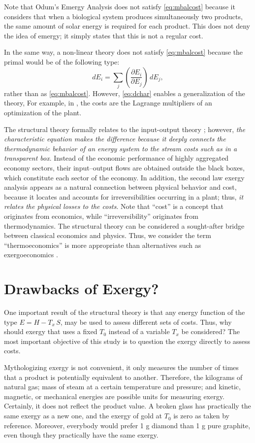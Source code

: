 \documentclass[energies,article,submit,moreauthors,pdftex]{Definitions/mdpi}
\newcommand{\dpartial}[2]{\left(\dfrac{\partial E_{#1}}{\partial E_{#2}}\right)}
\begin{document}
Note that Odum's Emergy Analysis \cite{Odum1988,Brown1996} does not satisfy \eqref{eq:mbalcost} because it considers that when a biological system produces simultaneously two products, the same amount of solar energy is required for each product. This does not deny the idea of emergy; it simply states that this is not a regular cost.

In the same way, a non-linear theory does not satisfy \cref{eq:mbalcost} because the primal would be of the following type:
\begin{equation}
dE_i=\sum_j \dpartial{i}{j}\, dE_j,
\label{eq:dchar}
\end{equation}
rather than as \cref{eq:mbalcost}. However, \cref{eq:dchar} enables a generalization of the theory, For example, in \cite{Brown1996}, the costs are the Lagrange multipliers of an optimization of the plant.

The structural theory formally relates to the input-output theory \cite{Leontief1970}; however, \emph{the characteristic equation makes the difference because it deeply connects the thermodynamic behavior of an energy system to the stream costs such as in a transparent box}. Instead of the economic performance of highly aggregated economy sectors, their input–output flows are obtained outside the black boxes, which constitute each sector of the economy. In addition, the second law exergy analysis appears as a natural connection between physical behavior and cost, because it locates and accounts for irreversibilities occurring in a plant; thus, \emph{it relates the physical losses to the costs}. Note that “cost” is a concept that originates from economics, while “irreversibility” originates from thermodynamics. The structural theory can be considered a sought-after bridge between classical economics and physics. Thus, we consider the term “thermoeconomics” is more appropriate than alternatives such as exergoeconomics \cite{Tsatsaronis2007}. 


\section{Drawbacks of Exergy?}
One important result of the structural theory is that any energy function of the type ${E=H-T_x\,S}$, may be used to assess different sets of costs. Thus, why should exergy that uses a fixed $T_0$ instead of a variable $T_x$ be considered? The most important objective of this study is to question the exergy directly to assess costs. 

Mythologizing exergy is not convenient, it only measures the number of times that a product is potentially equivalent to another. Therefore, the kilograms of natural gas; mass of steam at a certain temperature and pressure; and kinetic, magnetic, or mechanical energies are possible units for measuring exergy. Certainly, it does not reflect the product value. A broken glass has practically the same exergy as a new one, and the  exergy of gold at $T_0$ is zero as taken by reference. Moreover, everybody would prefer 1 g diamond than 1 g pure graphite, even though they practically have the same exergy.
\end{document}

